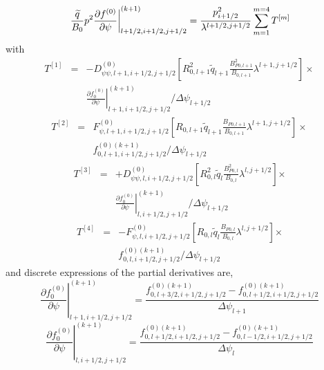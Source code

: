 \begin{equation}
\left. \frac{\widetilde{q}}{B_{0}}p^{2}\frac{\partial f^{\left( 0\right) }}{%
\partial \psi }\right| _{l+1/2,i+1/2,j+1/2}^{(k+1)}=\frac{p_{i+1/2}^{2}}{%
\lambda ^{l+1/2,j+1/2}}\sum_{m=1}^{m=4}T^{\left[ m\right] }
\end{equation}
with
\begin{eqnarray}
T^{\left[ 1\right] } &=&-D_{\psi \psi ,l+1,i+1/2,j+1/2}^{\left( 0\right)
}\left[ R_{0,l+1}^{2}\widetilde{q}_{l+1}\frac{B_{P0,l+1}^{2}}{B_{0,l+1}}%
\lambda ^{l+1,j+1/2}\right] \times   \nonumber \\
&&\left. \frac{\partial f_{0}^{\left( 0\right) }}{\partial \psi }\right|
_{l+1,i+1/2,j+1/2}^{\left( k+1\right) }/\Delta \psi _{l+1/2}
\end{eqnarray}
\begin{eqnarray}
T^{\left[ 2\right] } &=&F_{\psi ,l+1,i+1/2,j+1/2}^{\left( 0\right) }\left[
R_{0,l+1}\widetilde{q}_{l+1}\frac{B_{P0,l+1}}{B_{0,l+1}}\lambda
^{l+1,j+1/2}\right] \times   \nonumber \\
&&f_{0,l+1,i+1/2,j+1/2}^{\left( 0\right) \left( k+1\right) }/\Delta \psi
_{l+1/2}
\end{eqnarray}
\begin{eqnarray}
T^{\left[ 3\right] } &=&+D_{\psi \psi ,l,i+1/2,j+1/2}^{\left( 0\right)
}\left[ R_{0,l}^{2}\widetilde{q}_{l}\frac{B_{P0,l}^{2}}{B_{0,l}}\lambda
^{l,j+1/2}\right] \mathbf{\times }  \nonumber \\
&&\left. \frac{\partial f_{0}^{\left( 0\right) }}{\partial \psi }\right|
_{l,i+1/2,j+1/2}^{\left( k+1\right) }/\Delta \psi _{l+1/2}
\end{eqnarray}
\begin{eqnarray}
T^{\left[ 4\right] } &=&-F_{\psi ,l,i+1/2,j+1/2}^{\left( 0\right) }\left[
R_{0,l}\widetilde{q}_{l}\frac{B_{P0,l}}{B_{0,l}}\lambda ^{l,j+1/2}\right]
\mathbf{\times }  \nonumber \\
&&f_{0,l,i+1/2,j+1/2}^{\left( 0\right) \left( k+1\right) }/\Delta \psi
_{l+1/2}
\end{eqnarray}
and discrete expressions of the partial derivatives are,
\begin{equation}
\left. \frac{\partial f_{0}^{\left( 0\right) }}{\partial \psi }\right|
_{l+1,i+1/2,j+1/2}^{(k+1)}=\frac{f_{0,l+3/2,i+1/2,j+1/2}^{\left( 0\right)
(k+1)}-f_{0,l+1/2,i+1/2,j+1/2}^{\left( 0\right) (k+1)}}{\Delta \psi _{l+1}}
\end{equation}
\begin{equation}
\left. \frac{\partial f_{0}^{\left( 0\right) }}{\partial \psi }\right|
_{l,i+1/2,j+1/2}^{(k+1)}=\frac{f_{0,l+1/2,i+1/2,j+1/2}^{\left( 0\right)
(k+1)}-f_{0,l-1/2,i+1/2,j+1/2}^{\left( 0\right) (k+1)}}{\Delta \psi _{l}}
\end{equation}

